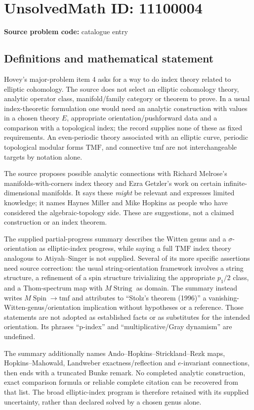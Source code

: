\documentclass[11pt]{article}
\begin{document}
\section*{UnsolvedMath ID: 11100004}
\textbf{Source problem code:} catalogue entry
\subsection{Definitions and mathematical statement}
Hovey's major-problem item 4 asks for a way to do index theory related to elliptic cohomology. The source does not select an elliptic cohomology theory, analytic operator class, manifold/family category or theorem to prove. In a usual index-theoretic formulation one would need an analytic construction with values in a chosen theory \(E\), appropriate orientation/pushforward data and a comparison with a topological index; the record supplies none of these as fixed requirements. An even-periodic theory associated with an elliptic curve, periodic topological modular forms \(\mathrm{TMF}\), and connective \(\mathrm{tmf}\) are not interchangeable targets by notation alone.

The source proposes possible analytic connections with Richard Melrose's manifolds-with-corners index theory and Ezra Getzler's work on certain infinite-dimensional manifolds. It says these \emph{might} be relevant and expresses limited knowledge; it names Haynes Miller and Mike Hopkins as people who have considered the algebraic-topology side. These are suggestions, not a claimed construction or an index theorem.

The supplied partial-progress summary describes the Witten genus and a \(\sigma\)-orientation as elliptic-index progress, while saying a full \(\mathrm{TMF}\) index theory analogous to Atiyah--Singer is not supplied. Several of its more specific assertions need source correction: the usual string-orientation framework involves a string structure, a refinement of a spin structure trivializing the appropriate \(p_1/2\) class, and a Thom-spectrum map with \(M\operatorname{String}\) as domain. The summary instead writes \(M\operatorname{Spin}\to\mathrm{tmf}\) and attributes to ``Stolz's theorem (1996)'' a vanishing-Witten-genus/orientation implication without hypotheses or a reference. Those statements are not adopted as established facts or as substitutes for the intended orientation. Its phrases ``p-index'' and ``multiplicative/Gray dynamism'' are undefined.

The summary additionally names Ando--Hopkins--Strickland--Rezk maps, Hopkins--Mahowald, Landweber exactness/reflection and \(e\)-invariant connections, then ends with a truncated Bunke remark. No completed analytic construction, exact comparison formula or reliable complete citation can be recovered from that list. The broad elliptic-index program is therefore retained with its supplied uncertainty, rather than declared solved by a chosen genus alone.
\end{document}
